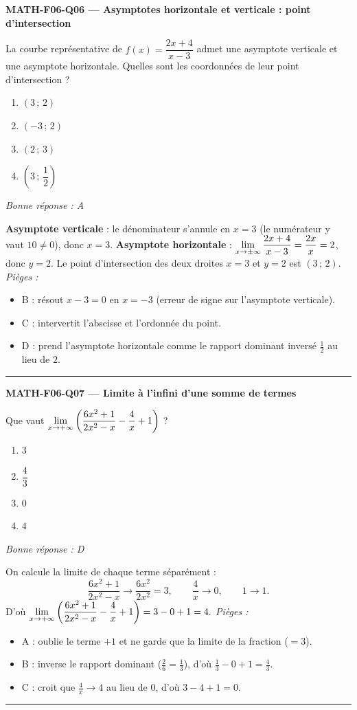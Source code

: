 \documentclass[11pt,a4paper]{article}
\begin{document}
\noindent\textbf{MATH-F06-Q06 --- Asymptotes horizontale et verticale : point d'intersection}\par
La courbe représentative de $f(x)=\dfrac{2x+4}{x-3}$ admet une asymptote verticale et une asymptote
horizontale. Quelles sont les coordonnées de leur point d'intersection ?
\begin{enumerate}[label=\Alph*)]
\item $(3\,;\,2)$
\item $(-3\,;\,2)$
\item $(2\,;\,3)$
\item $\left(3\,;\,\dfrac{1}{2}\right)$
\end{enumerate}
\textit{Bonne réponse : A}\par
\textbf{Asymptote verticale} : le dénominateur s'annule en $x=3$ (le numérateur y vaut $10\neq 0$), donc
$x=3$. \textbf{Asymptote horizontale} : $\displaystyle\lim_{x\to\pm\infty}\frac{2x+4}{x-3}=\frac{2x}{x}=2$, donc $y=2$.
Le point d'intersection des deux droites $x=3$ et $y=2$ est $(3\,;\,2)$.
\textit{Pièges :}
\begin{itemize}
\item B : résout $x-3=0$ en $x=-3$ (erreur de signe sur l'asymptote verticale).
\item C : intervertit l'abscisse et l'ordonnée du point.
\item D : prend l'asymptote horizontale comme le rapport dominant inversé $\tfrac12$ au lieu de $2$.
\end{itemize}
\vspace{8pt}\hrule\vspace{8pt}

\noindent\textbf{MATH-F06-Q07 --- Limite à l'infini d'une somme de termes}\par
Que vaut $\displaystyle\lim_{x\to +\infty}\left(\frac{6x^{2}+1}{2x^{2}-x}-\frac{4}{x}+1\right)$ ?
\begin{enumerate}[label=\Alph*)]
\item $3$
\item $\dfrac{4}{3}$
\item $0$
\item $4$
\end{enumerate}
\textit{Bonne réponse : D}\par
On calcule la limite de chaque terme séparément :
\[ \frac{6x^{2}+1}{2x^{2}-x}\to\frac{6x^{2}}{2x^{2}}=3,\qquad \frac{4}{x}\to 0,\qquad 1\to 1. \]
D'où $\displaystyle\lim_{x\to +\infty}\left(\frac{6x^{2}+1}{2x^{2}-x}-\frac{4}{x}+1\right)=3-0+1=4.$
\textit{Pièges :}
\begin{itemize}
\item A : oublie le terme $+1$ et ne garde que la limite de la fraction ($=3$).
\item B : inverse le rapport dominant ($\tfrac{2}{6}=\tfrac13$), d'où $\tfrac13-0+1=\tfrac43$.
\item C : croit que $\tfrac{4}{x}\to 4$ au lieu de $0$, d'où $3-4+1=0$.
\end{itemize}
\vspace{8pt}\hrule\vspace{8pt}
\end{document}
